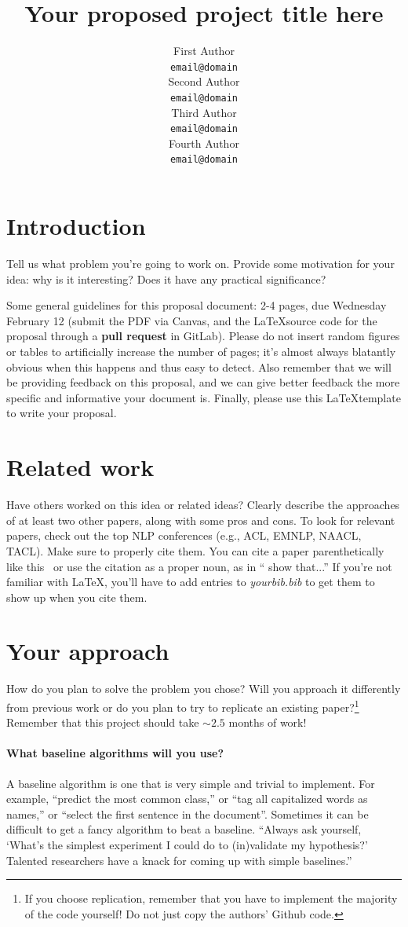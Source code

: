 \documentclass[11pt,a4paper]{article}
\title{Your proposed project title here}
\author{First Author \\
  {\tt email@domain} \\\And
  Second Author \\
  {\tt email@domain} \\\And
  Third Author \\
  {\tt email@domain} \\\And
  Fourth Author \\
  {\tt email@domain} \\}
\date{}
\begin{document}
\maketitle

\section{Introduction}
Tell us what problem you're going to work on. Provide some motivation for your idea: why is it interesting? Does it have any practical significance? 

Some general guidelines for this proposal document: 2-4 pages, due Wednesday February 12 (submit the PDF via Canvas, and the \LaTeX source code for the proposal through a \textbf{pull request} in GitLab). Please do not insert random figures or tables to artificially increase the number of pages; it's almost always blatantly obvious when this happens and thus easy to detect. Also remember that we will be providing feedback on this proposal, and we can give better feedback the more specific and informative your document is. Finally, please use this \LaTeX template to write your proposal.

\section{Related work}
Have others worked on this idea or related ideas? Clearly describe the approaches of at least two other papers, along with some pros and cons. To look for relevant papers, check out the top NLP conferences (e.g., ACL, EMNLP, NAACL, TACL). Make sure to properly cite them. You can cite a paper parenthetically like this~\cite{andrew2007scalable} or use the citation as a proper noun, as in `` show that...'' If you're not familiar with \LaTeX, you'll have to add entries to \emph{yourbib.bib} to get them to show up when you cite them. 

\section{Your approach}
How do you plan to solve the problem you chose? Will you approach it differently from previous work or do you plan to try to replicate an existing paper?\footnote{If you choose replication, remember that you have to implement the majority of the code yourself! Do not just copy the authors' Github code.} Remember that this project should take $\sim 2.5$ months of work!

\paragraph{What baseline algorithms will you use?}
A baseline algorithm is one that is very simple and trivial to implement. For example, “predict the most common class,” or “tag all capitalized words as names,” or “select the first sentence in the document”. Sometimes it can be difficult to get a fancy algorithm to beat a baseline. “Always ask yourself, ‘What’s the simplest experiment I could do to (in)validate my hypothesis?’ Talented researchers have a knack for coming up with simple baselines.”
\end{document}

